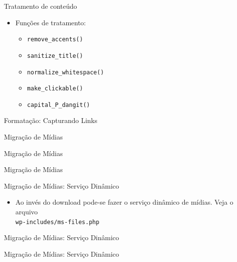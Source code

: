 \documentclass[handout]{beamer}
\begin{document}
\begin{frame}{Tratamento de conteúdo}
  \begin{itemize}
    \pause \item Funções de tratamento:
    \begin{itemize}
      \pause \item \texttt{remove\_accents()}
      \pause \item \texttt{sanitize\_title()}
      \pause \item \texttt{normalize\_whitespace()}
      \pause \item \texttt{make\_clickable()}
      \pause \item \texttt{capital\_P\_dangit()}
    \end{itemize}
  \end{itemize}
\end{frame}

\begin{frame}{Formatação: Capturando Links}
  
\end{frame}

\begin{frame}{Migração de Mídias}
  
\end{frame}

\begin{frame}{Migração de Mídias}
  
\end{frame}

\begin{frame}{Migração de Mídias}
  
\end{frame}

\begin{frame}{Migração de Mídias: Serviço Dinâmico}
  \begin{itemize}
    \item Ao invés do download pode-se fazer o serviço dinâmico de mídias.
          Veja o arquivo \\
          \texttt{wp-includes/ms-files.php}
  \end{itemize}
\end{frame}

\begin{frame}{Migração de Mídias: Serviço Dinâmico}
  
\end{frame}

\begin{frame}{Migração de Mídias: Serviço Dinâmico}
  
\end{frame}
\end{document}
